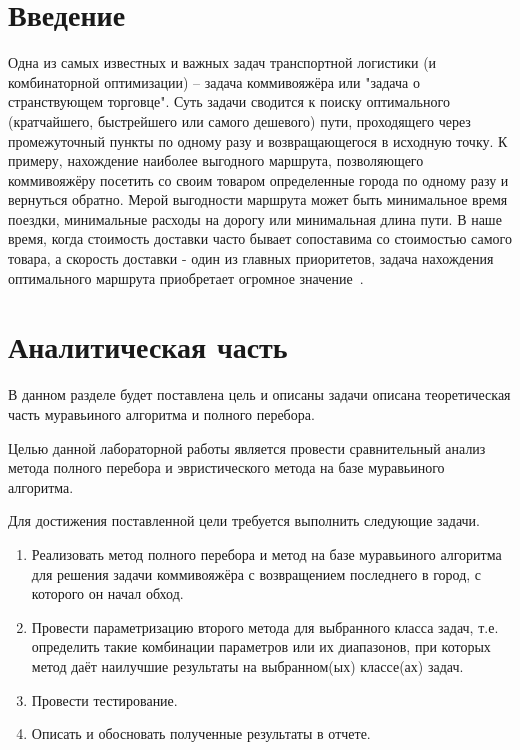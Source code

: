 \documentclass[a4paper,oneside,14pt]{extreport}
\begin{document}

\newpage
\tableofcontents
{}

\newpage

\chapter*{Введение}

Одна из самых известных и важных задач транспортной логистики (и комбинаторной оптимизации) – задача коммивояжёра или "задача о странствующем торговце". Суть задачи сводится к поиску оптимального (кратчайшего, быстрейшего или самого дешевого) пути, проходящего через промежуточный пункты по одному разу и возвращающегося в исходную точку. К примеру, нахождение наиболее выгодного маршрута, позволяющего коммивояжёру посетить со своим товаром определенные города по одному разу и вернуться обратно. Мерой выгодности маршрута может быть минимальное время поездки, минимальные расходы на дорогу или минимальная длина пути. В наше время, когда стоимость доставки часто бывает сопоставима со стоимостью самого товара, а скорость доставки - один из главных приоритетов, задача нахождения оптимального маршрута приобретает огромное значение~\cite{1}.
\newpage

\chapter{Аналитическая часть}	
В данном разделе будет поставлена цель и описаны задачи описана теоретическая часть муравьиного алгоритма и полного перебора.

Целью данной лабораторной работы является провести сравнительный анализ метода полного перебора и эвристического метода на базе муравьиного алгоритма.

Для достижения поставленной цели требуется выполнить следующие задачи.
\begin{enumerate}
	\item Реализовать метод полного перебора и метод на базе муравьиного алгоритма для решения задачи коммивояжёра с возвращением последнего в город, с которого он начал обход.
	
	\item Провести параметризацию второго метода для выбранного класса задач, т.е. определить такие комбинации параметров или их диапазонов, при которых метод даёт наилучшие результаты на выбранном(ых) классе(ах) задач.
	
	\item Провести тестирование.
	
	\item Описать и обосновать полученные результаты в отчете.
\end{enumerate}
\end{document}
